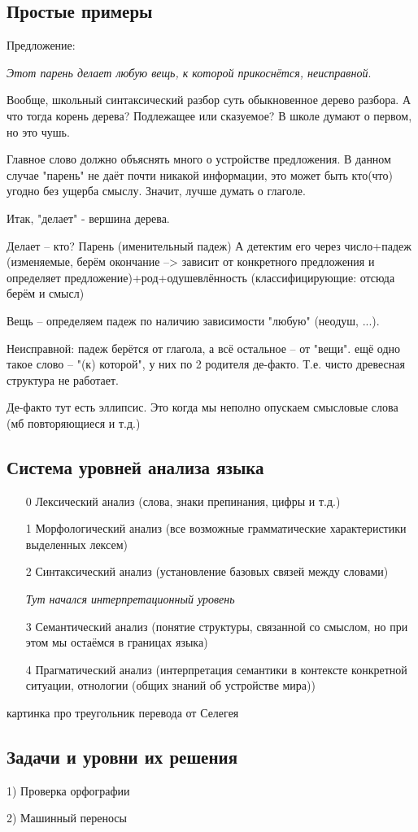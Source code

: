 \documentclass[a4paper,12pt]{article}
\theoremstyle{plain} %
\theoremstyle{definition} %
\theoremstyle{remark} %
\begin{document}
	\subsection{ Простые примеры }
	
	Предложение: 
	
	{\it Этот парень делает любую вещь, к которой прикоснётся, неисправной}.
	
	Вообще, школьный синтаксический разбор суть обыкновенное дерево разбора. А что тогда корень дерева? Подлежащее или сказуемое? В школе думают о первом, но это чушь.
	
	Главное слово должно объяснять много о устройстве предложения. В данном случае "парень" не даёт почти никакой информации, это может быть кто(что) угодно без ущерба смыслу. Значит, лучше думать о глаголе.
	
	Итак, "делает" - вершина дерева.
	
	Делает -- кто? Парень (именительный падеж) А детектим его через число+падеж (изменяемые, берём окончание --> зависит от конкретного предложения и определяет предложение)+род+одушевлённость (классифицирующие: отсюда берём и смысл)
	
	Вещь -- определяем падеж по наличию зависимости "любую" (неодуш, ...).
	
	Неисправной: падеж берётся от глагола, а всё остальное -- от "вещи". ещё одно такое слово -- "(к) которой", у них по 2 родителя де-факто. Т.е. чисто древесная структура не работает.
	
	Де-факто тут есть эллипсис. Это когда мы неполно опускаем смысловые слова (мб повторяющиеся и т.д.)

	\subsection { Система уровней анализа языка }
	
	\begin{itemize}
		\item[0] Лексический анализ (слова, знаки препинания, цифры и т.д.)
		
		\item[1] Морфологический анализ (все возможные грамматические характеристики выделенных лексем)
		
		\item[2] Синтаксический анализ (установление базовых связей между словами)
		
		\item[] {\it Тут начался интерпретационный уровень}
		
		\item[3] Семантический анализ (понятие структуры, связанной со смыслом, но при этом мы остаёмся в границах языка)
		
		\item[4] Прагматический анализ (интерпретация семантики в контексте конкретной ситуации, отнологии (общих знаний об устройстве мира))
	\end{itemize}
	
	картинка про треугольник перевода от Селегея
	
	\subsection { Задачи и уровни их решения } %
	
	1) Проверка орфографии
	
	2) Машинный переносы
\end{document}
